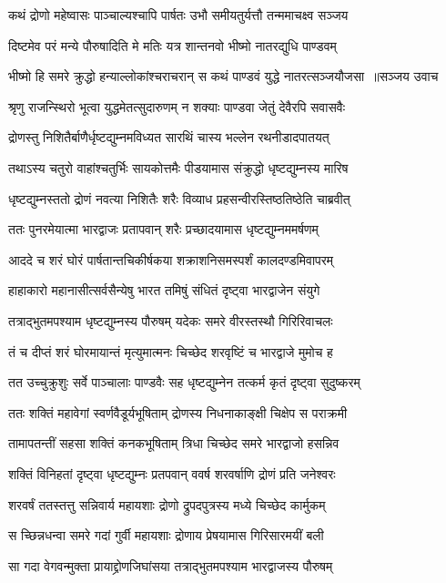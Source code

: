 \twolineshloka
{कथं द्रोणो महेष्वासः पाञ्चाल्यश्चापि पार्षतः}
{उभौ समीयतुर्यत्तौ तन्ममाचक्ष्व सञ्जय}


\twolineshloka
{दिष्टमेव परं मन्ये पौरुषादिति मे मतिः}
{यत्र शान्तनवो भीष्मो नातरद्युधि पाण्डवम्}


\threelineshloka
{भीष्मो हि समरे क्रुद्धो हन्याल्लोकांश्चराचरान्}
{स कथं पाण्डवं युद्धे नातरत्सञ्जयौजसा ॥सञ्जय उवाच}
{}


\twolineshloka
{श्रृणु राजन्स्थिरो भूत्वा युद्धमेतत्सुदारुणम्}
{न शक्याः पाण्डवा जेतुं देवैरपि सवासवैः}


\twolineshloka
{द्रोणस्तु निशितैर्बाणैर्धृष्टद्युम्नमविध्यत}
{सारथिं चास्य भल्लेन रथनीडादपातयत्}


\twolineshloka
{तथाऽस्य चतुरो वाहांश्चतुर्भिः सायकोत्तमैः}
{पीडयामास संक्रुद्धो धृष्टद्युम्नस्य मारिष}


\twolineshloka
{धृष्टद्युम्नस्ततो द्रोणं नवत्या निशितैः शरैः}
{विव्याध प्रहसन्वीरस्तिष्ठतिष्ठेति चाब्रवीत्}


\twolineshloka
{ततः पुनरमेयात्मा भारद्वाजः प्रतापवान्}
{शरैः प्रच्छादयामास धृष्टद्युम्नममर्षणम्}


\twolineshloka
{आददे च शरं घोरं पार्षतान्तचिकीर्षकया}
{शक्राशनिसमस्पर्शं कालदण्डमिवापरम्}


\twolineshloka
{हाहाकारो महानासीत्सर्वसैन्येषु भारत}
{तमिषुं संधितं दृष्ट्वा भारद्वाजेन संयुगे}


\twolineshloka
{तत्राद्भुतमपश्याम धृष्टद्युम्नस्य पौरुषम्}
{यदेकः समरे वीरस्तस्थौ गिरिरिवाचलः}


\twolineshloka
{तं च दीप्तं शरं घोरमायान्तं मृत्युमात्मनः}
{चिच्छेद शरवृष्टिं च भारद्वाजे मुमोच ह}


\twolineshloka
{तत उच्चुक्रुशुः सर्वे पाञ्चालाः पाण्डवैः सह}
{धृष्टद्युम्नेन तत्कर्म कृतं दृष्ट्वा सुदुष्करम्}


\twolineshloka
{ततः शक्तिं महावेगां स्वर्णवैडूर्यभूषिताम्}
{द्रोणस्य निधनाकाङ्क्षी चिक्षेप स पराक्रमी}


\twolineshloka
{तामापतन्तीं सहसा शक्तिं कनकभूषिताम्}
{त्रिधा चिच्छेद समरे भारद्वाजो हसन्निव}


\twolineshloka
{शक्तिं विनिहतां दृष्ट्वा धृष्टद्युम्नः प्रतपवान्}
{ववर्ष शरवर्षाणि द्रोणं प्रति जनेश्वरः}


\twolineshloka
{शरवर्षं ततस्तत्तु सन्निवार्य महायशाः}
{द्रोणो द्रुपदपुत्रस्य मध्ये चिच्छेद कार्मुकम्}


\twolineshloka
{स च्छिन्नधन्वा समरे गदां गुर्वी महायशाः}
{द्रोणाय प्रेषयामास गिरिसारमयीं बली}


\twolineshloka
{सा गदा वेगवन्मुक्ता प्रायाद्द्रोणजिघांसया}
{तत्राद्भुतमपश्याम भारद्वाजस्य पौरुषम्}


